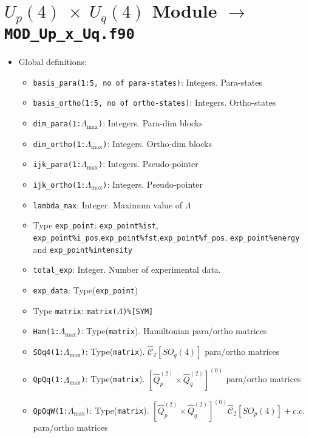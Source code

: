 \documentclass[english,twoside, openright]{report}
\newcommand{\cas}[2]{
  \hat{\mathcal{C}}_{#1}\left[#2\right]
}
\begin{document}
\section{$U_p(4)\;\times\;U_q(4)$ Module $\rightarrow$ \texttt{MOD\_Up\_x\_Uq.f90}}

\begin{itemize}
\item Global definitions:
  \begin{itemize}
  \item \texttt{basis\_para(1:5, no of para-states)}: Integers. Para-states
  \item \texttt{basis\_ortho(1:5, no of ortho-states)}: Integers. Ortho-states
  \item \texttt{dim\_para(1:$\Lambda_{\text{max}}$)}: Integers. Para-dim blocks
  \item \texttt{dim\_ortho(1:$\Lambda_{\text{max}}$)}: Integers. Ortho-dim blocks
  \item \texttt{ijk\_para(1:$\Lambda_{\text{max}}$)}: Integers. Pseudo-pointer
  \item \texttt{ijk\_ortho(1:$\Lambda_{\text{max}}$)}: Integers. Pseudo-pointer
  \item \texttt{lambda\_max}: Integer. Maximum value of $\Lambda$
  \item Type \texttt{exp\_point}: \texttt{exp\_point\%ist}, \texttt{exp\_point\%i\_pos},\texttt{exp\_point\%fst},\texttt{exp\_point\%f\_pos}, \texttt{exp\_point\%energy} and \texttt{exp\_point\%intensity}
  \item \texttt{total\_exp}: Integer. Number of experimental data.
  \item \texttt{exp\_data}: Type(\texttt{exp\_point})
  \item Type \texttt{matrix}: \texttt{matrix($\Lambda$)\%[SYM]}
  \item \texttt{Ham(1:$\Lambda_{\text{max}}$)}: Type(\texttt{matrix}). Hamiltonian para/ortho matrices
  \item \texttt{SOq4(1:$\Lambda_{\text{max}}$)}: Type(\texttt{matrix}). $\cas{2}{SO_q(4)}$ para/ortho matrices
  \item \texttt{QpQq(1:$\Lambda_{\text{max}}$)}: Type(\texttt{matrix}). $\left[\hat{Q}_p^{(2)}\times\hat{Q}_q^{(2)}\right]^{(0)}$ para/ortho matrices
  \item \texttt{QpQqW(1:$\Lambda_{\text{max}}$)}: Type(\texttt{matrix}). $\left[\hat{Q}_p^{(2)}\times\hat{Q}_q^{(2)}\right]^{(0)} \cas{2}{SO_p(4)} + c.c.$ para/ortho matrices
  

\end{itemize}
\end{itemize}
\end{document}
